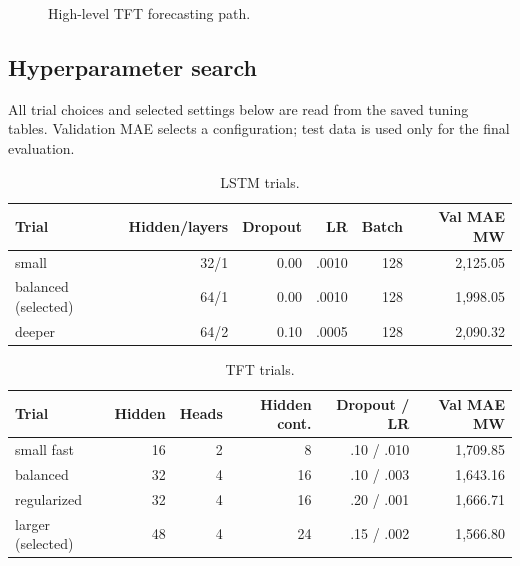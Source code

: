 \documentclass[11pt,a4paper]{article}
\begin{document}
\begin{figure}[H]\centering
{}
\caption{High-level TFT forecasting path.}\end{figure}

\subsection{Hyperparameter search}
All trial choices and selected settings below are read from the saved tuning tables. Validation MAE selects a configuration; test data is used only for the final evaluation.
\begin{table}[H]\centering\small\caption{LSTM trials.}\begin{tabular}{lrrrrr}\toprule Trial & Hidden/layers & Dropout & LR & Batch & Val MAE MW \\\midrule small & 32/1 & 0.00 & .0010 & 128 & 2,125.05 \\ balanced (selected) & 64/1 & 0.00 & .0010 & 128 & 1,998.05 \\ deeper & 64/2 & 0.10 & .0005 & 128 & 2,090.32 \\\bottomrule\end{tabular}\end{table}
\begin{table}[H]\centering\small\caption{TFT trials.}\begin{tabular}{lrrrrr}\toprule Trial & Hidden & Heads & Hidden cont. & Dropout / LR & Val MAE MW \\\midrule small fast & 16 & 2 & 8 & .10 / .010 & 1,709.85 \\ balanced & 32 & 4 & 16 & .10 / .003 & 1,643.16 \\ regularized & 32 & 4 & 16 & .20 / .001 & 1,666.71 \\ larger (selected) & 48 & 4 & 24 & .15 / .002 & 1,566.80 \\\bottomrule\end{tabular}\end{table}
\end{document}
